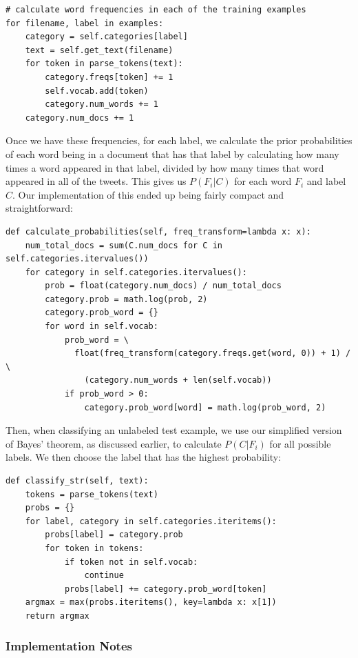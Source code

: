 \documentclass[12pt,a4paper]{article}
\begin{document}
\begin{verbatim}
# calculate word frequencies in each of the training examples
for filename, label in examples:
    category = self.categories[label]
    text = self.get_text(filename)
    for token in parse_tokens(text):
        category.freqs[token] += 1
        self.vocab.add(token)
        category.num_words += 1
    category.num_docs += 1
\end{verbatim}

Once we have these frequencies, for each label, we calculate the prior probabilities of each word being in a document that has that label by calculating how many times a word appeared in that label, divided by how many times that word appeared in all of the tweets. This gives us $P(F_i | C)$ for each word $F_i$ and label $C$. Our implementation of this ended up being fairly compact and straightforward:

\begin{verbatim}
def calculate_probabilities(self, freq_transform=lambda x: x):
    num_total_docs = sum(C.num_docs for C in self.categories.itervalues())
    for category in self.categories.itervalues():
        prob = float(category.num_docs) / num_total_docs
        category.prob = math.log(prob, 2)
        category.prob_word = {}
        for word in self.vocab:
            prob_word = \
              float(freq_transform(category.freqs.get(word, 0)) + 1) / \
                (category.num_words + len(self.vocab))
            if prob_word > 0:
                category.prob_word[word] = math.log(prob_word, 2)
\end{verbatim}

Then, when classifying an unlabeled test example, we use our simplified version of Bayes' theorem, as discussed earlier, to calculate $P(C | F_i)$ for all possible labels. We then choose the label that has the highest probability:

\begin{verbatim}
def classify_str(self, text):
    tokens = parse_tokens(text)
    probs = {}
    for label, category in self.categories.iteritems():
        probs[label] = category.prob
        for token in tokens:
            if token not in self.vocab:
                continue
            probs[label] += category.prob_word[token]
    argmax = max(probs.iteritems(), key=lambda x: x[1])
    return argmax
\end{verbatim}

\subsubsection { Implementation Notes }
\end{document}
